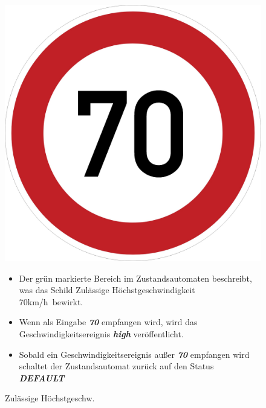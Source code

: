 \begin{figure}[h]
	\begin{minipage}[t]{4cm}
		\vspace{0pt}
		\centering
		\includegraphics[scale=0.06]{images/70.png}
		\caption{Zul\"assige H\"ochstgeschw.}
		\label{fig:PED}
	\end{minipage}
	\hfill
	\begin{minipage}[t]{10cm}
		\vspace{0pt}
		\begin{itemize}
			\item Der gr\"un markierte Bereich im Zustandsautomaten beschreibt, was das Schild \glqq Zul\"assige H\"ochstgeschwindigkeit 70km/h\grqq \ bewirkt.
			
			\item Wenn als Eingabe \textbf{\textit{70}} empfangen wird, wird das Geschwindigkeitsereignis \textbf{\textit{high}} ver\"offentlicht.
			
			\item Sobald ein Geschwindigkeitsereignis au\ss{}er \textbf{\textit{70}} empfangen wird schaltet der Zustandsautomat zur\"uck auf den Status \textbf{\textit{DEFAULT}}
		\end{itemize}
	\end{minipage}
\end{figure}


